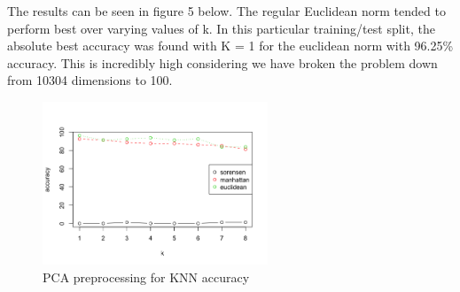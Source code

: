 \documentclass[11pt]{article}
\begin{document}
The results can be seen in figure 5 below. The regular Euclidean norm tended to perform best over varying values of k. In this particular training/test split, the absolute best accuracy was found with K = 1 for the euclidean norm with 96.25\% accuracy. This is incredibly high considering we have broken the problem down from 10304 dimensions to 100.

\begin{figure}[b!]
\caption{PCA preprocessing for KNN accuracy}
\centering
\includegraphics[width=0.6\textwidth]{final}
\end{figure}
\end{document}
